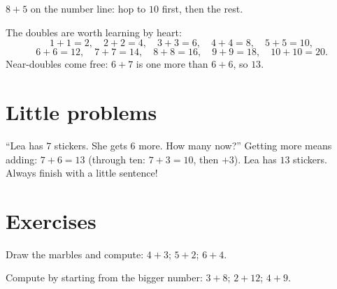 \begin{omfigure}

{\small $8 + 5$ on the number line: hop to $10$ first, then the rest.}
\end{omfigure}

\begin{example}[Doubles]\label{ex:g1:addition:doubles}
The doubles are worth learning by heart:
\[
1+1=2, \quad 2+2=4, \quad 3+3=6, \quad 4+4=8, \quad 5+5=10,
\]
\[
6+6=12, \quad 7+7=14, \quad 8+8=16, \quad 9+9=18, \quad 10+10=20 .
\]
Near-doubles come free: $6 + 7$ is one more than $6 + 6$, so $13$.
\end{example}

\section{Little problems}

\begin{example}\label{ex:g1:addition:problem}
``Lea has $7$ stickers. She gets $6$ more. How many now?''
Getting more means adding: $7 + 6 = 13$ (through ten:
$7 + 3 = 10$, then $+3$). Lea has $13$ stickers. Always finish with
a little sentence!
\end{example}

\section{Exercises}

\begin{exercise}[$\star$]\label{exo:g1:addition:1}
Draw the marbles and compute: $4 + 3$; \quad $5 + 2$; \quad
$6 + 4$.
\end{exercise}

\begin{exercise}[$\star$]\label{exo:g1:addition:2}
Compute by starting from the bigger number: $3 + 8$; \quad
$2 + 12$; \quad $4 + 9$.
\end{exercise}

